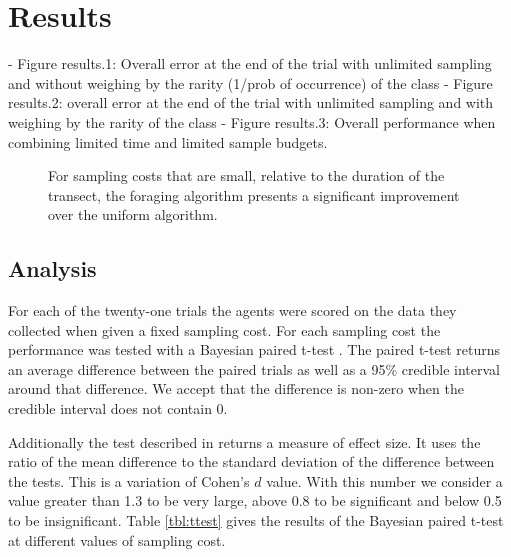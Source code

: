 \section{Results}
\label{sec:results}


- Figure results.1: Overall error at the end of the trial with unlimited sampling and without weighing by the rarity (1/prob of occurrence) of the class
- Figure results.2: overall error at the end of the trial with unlimited sampling and with weighing by the rarity of the class
- Figure results.3: Overall performance when combining limited time and limited sample budgets.


% 

\begin{figure}[htpd!]
	\centering
	\def\svgwidth{\columnwidth}
	
	\caption{For sampling costs that are small, relative to the duration of the transect, the foraging algorithm presents a significant improvement over the uniform algorithm.}
	\label{fig:err}
\end{figure}


\subsection{Analysis}

For each of the twenty-one trials the agents were scored on the data they collected when given a fixed sampling cost.  For each sampling cost the performance was tested with a Bayesian paired t-test \cite{baath2014bayesian}.  The paired t-test returns an average difference between the paired trials as well as a 95\% credible interval around that difference.  We accept that the difference is non-zero when the credible interval does not contain 0.  

Additionally the test described in \cite{baath2015bayesian} returns a measure of effect size.  It uses the ratio of the mean difference to the standard deviation of the difference between the tests.  This is a variation of Cohen's $d$ value\cite{cohen2013statistical}.  With this number we consider a value greater than 1.3 to be very large, above 0.8 to be significant and below 0.5 to be insignificant.  Table \ref{tbl:ttest} gives the results of the Bayesian paired t-test at different values of sampling cost.



